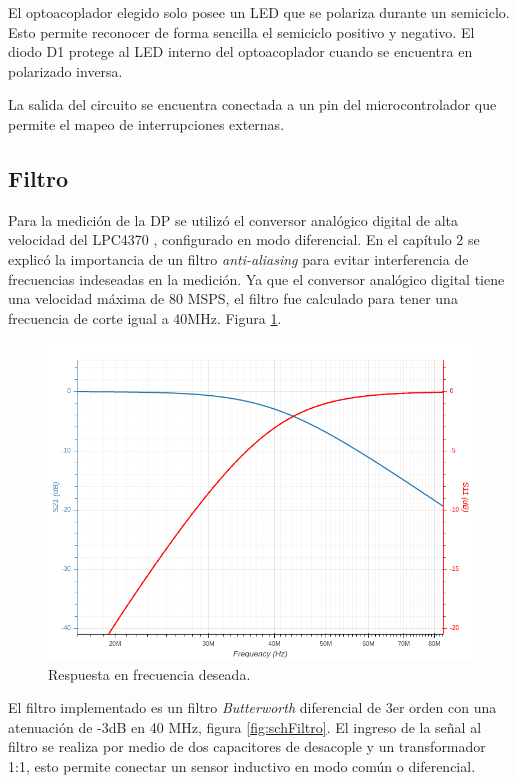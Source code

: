 \vspace{5mm}

El optoacoplador elegido solo posee un LED que se polariza durante un semiciclo. Esto permite reconocer de forma sencilla el semiciclo positivo y negativo. El diodo D1 protege al LED interno del optoacoplador cuando se encuentra en polarizado inversa.

La salida del circuito se encuentra conectada a un pin del microcontrolador que permite el mapeo de interrupciones externas.

\vspace{10mm}
\subsection{Filtro}

Para la medición de la DP se utilizó el conversor analógico digital de alta velocidad del LPC4370 \citep{micro:lpc4370}, configurado en modo diferencial. En el capítulo 2 se explicó la importancia de un filtro \textit{anti-aliasing} para evitar interferencia de frecuencias indeseadas en la medición. Ya que el conversor analógico digital tiene una velocidad máxima de 80 MSPS, el filtro fue calculado para tener una frecuencia de corte igual a 40MHz. Figura \ref{fig:respFrec}. 

\begin{figure}[ht]
	\centering
	\includegraphics[width=130mm]{./Figures/respFrec.png}
	\caption{Respuesta en frecuencia deseada.}
	\label{fig:respFrec}
\end{figure}


El filtro implementado es un filtro \textit{Butterworth} diferencial de 3er orden con una atenuación de -3dB en 40 MHz, figura \ref{fig:schFiltro}. El ingreso de la señal al filtro se realiza por medio de dos capacitores de desacople y un transformador 1:1, esto permite conectar un sensor inductivo en modo común o diferencial. 

